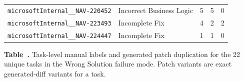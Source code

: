 \documentclass{article}
\begin{document}
\begin{center}
\begin{scriptsize}
\begin{tabular}{llrrr}
\texttt{microsoftInternal\_\_NAV-220452} & Incorrect Business Logic & 5 & 5 & 0 \\
\texttt{microsoftInternal\_\_NAV-223493} & Incomplete Fix & 4 & 2 & 2 \\
\texttt{microsoftInternal\_\_NAV-224447} & Incomplete Fix & 1 & 1 & 0 \\
\bottomrule
\end{tabular}
\end{scriptsize}
\endgroup
\vskip 0.05in
{\small \textbf{Table~\thetable.} Task-level manual labels and generated patch duplication for the 22 unique tasks in the Wrong Solution failure mode. Patch variants are exact generated-diff variants for a task.}
\end{center}
\vskip 0.1in

\clearpage
\twocolumn
\end{document}
